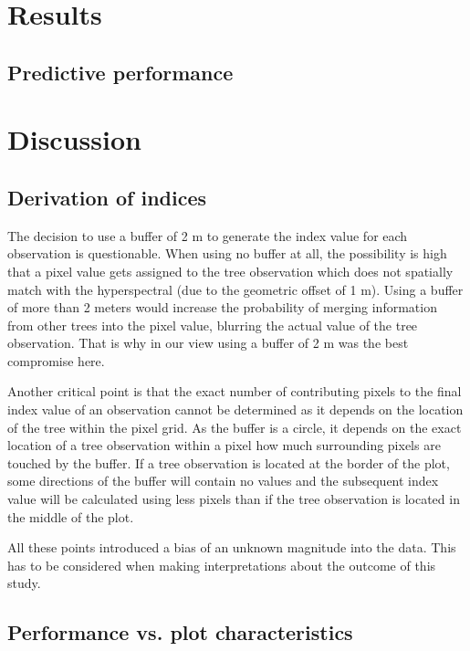 \documentclass[letterpaper, journal]{IEEEtran}
\begin{document}
\section{Results}

\subsection{Predictive performance}


\section{Discussion}

\subsection{Derivation of indices}

\noindent The decision to use a buffer of 2 m to generate the index value for each observation is questionable.
When using no buffer at all, the possibility is high that a pixel value gets assigned to the tree observation which does not spatially match with the hyperspectral (due to the geometric offset of 1 m).
Using a buffer of more than 2 meters would increase the probability of merging information from other trees into the pixel value, blurring the actual value of the tree observation.
That is why in our view using a buffer of 2 m was the best compromise here.

Another critical point is that the exact number of contributing pixels to the final index value of an observation cannot be determined as it depends on the location of the tree within the pixel grid.
As the buffer is a circle, it depends on the exact location of a tree observation within a pixel how much surrounding pixels are touched by the buffer.
If a tree observation is located at the border of the plot, some directions of the buffer will contain no values and the subsequent index value will be calculated using less pixels than if the tree observation is located in the middle of the plot.

All these points introduced a bias of an unknown magnitude into the data.
This has to be considered when making interpretations about the outcome of this study.

\subsection{Performance vs. plot characteristics}
\end{document}
